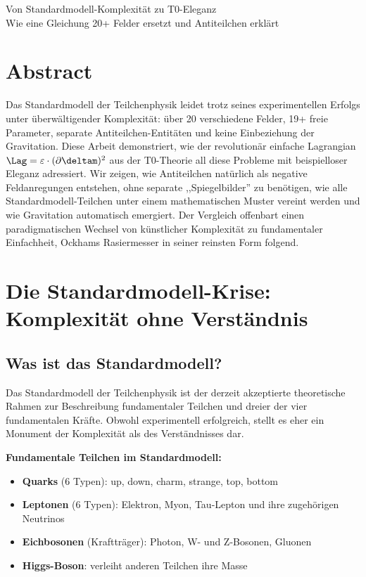 Von Standardmodell-Komplexität zu T0-Eleganz \\
	 Wie eine Gleichung 20+ Felder ersetzt und Antiteilchen erklärt
\section*{Abstract}
		Das Standardmodell der Teilchenphysik leidet trotz seines experimentellen Erfolgs unter überwältigender Komplexität: über 20 verschiedene Felder, 19+ freie Parameter, separate Antiteilchen-Entitäten und keine Einbeziehung der Gravitation. Diese Arbeit demonstriert, wie der revolutionär einfache Lagrangian $\Lag = \varepsilon \cdot (\partial \deltam)^2$ aus der T0-Theorie all diese Probleme mit beispielloser Eleganz adressiert. Wir zeigen, wie Antiteilchen natürlich als negative Feldanregungen entstehen, ohne separate ,,Spiegelbilder'' zu benötigen, wie alle Standardmodell-Teilchen unter einem mathematischen Muster vereint werden und wie Gravitation automatisch emergiert. Der Vergleich offenbart einen paradigmatischen Wechsel von künstlicher Komplexität zu fundamentaler Einfachheit, Ockhams Rasiermesser in seiner reinsten Form folgend.

	

	\section{Die Standardmodell-Krise: Komplexität ohne Verständnis}
	
	\subsection{Was ist das Standardmodell?}
	
	Das Standardmodell der Teilchenphysik ist der derzeit akzeptierte theoretische Rahmen zur Beschreibung fundamentaler Teilchen und dreier der vier fundamentalen Kräfte. Obwohl experimentell erfolgreich, stellt es eher ein Monument der Komplexität als des Verständnisses dar.
	
	\textbf{Fundamentale Teilchen im Standardmodell:}
	\begin{itemize}
		\item \textbf{Quarks} (6 Typen): up, down, charm, strange, top, bottom
		\item \textbf{Leptonen} (6 Typen): Elektron, Myon, Tau-Lepton und ihre zugehörigen Neutrinos
		\item \textbf{Eichbosonen} (Kraftträger): Photon, W- und Z-Bosonen, Gluonen  
		\item \textbf{Higgs-Boson}: verleiht anderen Teilchen ihre Masse
	\end{itemize}
	

